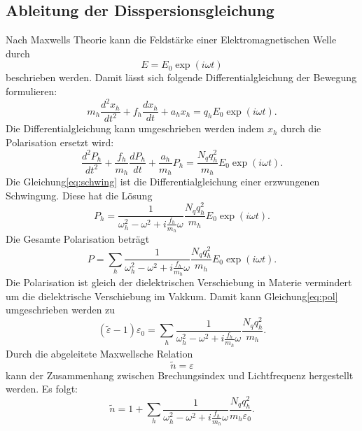 \subsection{Ableitung der Disspersionsgleichung}
Nach Maxwells Theorie kann die Feldstärke einer Elektromagnetischen Welle durch
\begin{equation}
  E = E_0 \exp(i\omega t)
\end{equation}
beschrieben werden.
Damit lässt sich folgende Differentialgleichung der Bewegung formulieren:
\begin{equation}
  m_h \frac{d^2 x_h}{dt^2} +f_h \frac{d x_h}{dt} + a_h x_h = q_h E_0 \exp(i\omega t)  .
\end{equation}
Die Differentialgleichung kann umgeschrieben werden indem $x_h$ durch die Polarisation ersetzt wird:
\begin{equation}
  \label{eq:schwing}
  \frac{d^2 P_h}{dt^2} +\frac{f_h}{m_h} \frac{d P_h}{dt} + \frac{a_h}{m_h} P_h = \frac{N_q q_h^2}{m_h} E_0 \exp(i\omega t)  .
\end{equation}
Die Gleichung\eqref{eq:schwing} ist die Differentialgleichung einer erzwungenen Schwingung.
Diese hat die Lösung
\begin{equation}
  P_h =\frac{1}{\omega_h ^2 -\omega ^2 + i\frac{f_h}{m_h}\omega}\frac{N_q q_h^2}{m_h} E_0 \exp(i\omega t) .
\end{equation}
Die Gesamte Polarisation beträgt
\begin{equation}
  \label{eq:pol}
  P=\sum_{h} \frac{1}{\omega_h ^2 -\omega ^2 + i\frac{f_h}{m_h}\omega}\frac{N_q q_h^2}{m_h} E_0 \exp(i\omega t) .
\end{equation}
Die Polarisation ist gleich der dielektrischen Verschiebung in Materie vermindert um die dielektrische Verschiebung im Vakkum.
Damit kann Gleichung\eqref{eq:pol} umgeschrieben werden zu
\begin{equation}
  (\tilde{\varepsilon} -1)\varepsilon_0 = \sum_{h} \frac{1}{\omega_h ^2 -\omega ^2 + i\frac{f_h}{m_h}\omega}\frac{N_q q_h^2}{m_h} .
\end{equation}
Durch die abgeleitete Maxwellsche Relation
\begin{equation}
  \tilde{n}=\varepsilon
\end{equation}
kann der Zusammenhang zwischen Brechungsindex und Lichtfrequenz hergestellt werden.
Es folgt:
\begin{equation}
  \label{eq:n}
  \tilde{n} =  1 + \sum_{h} \frac{1}{\omega_h ^2 -\omega ^2 + i\frac{f_h}{m_h}\omega}\frac{N_q q_h^2}{m_h \varepsilon_0} .
\end{equation}
